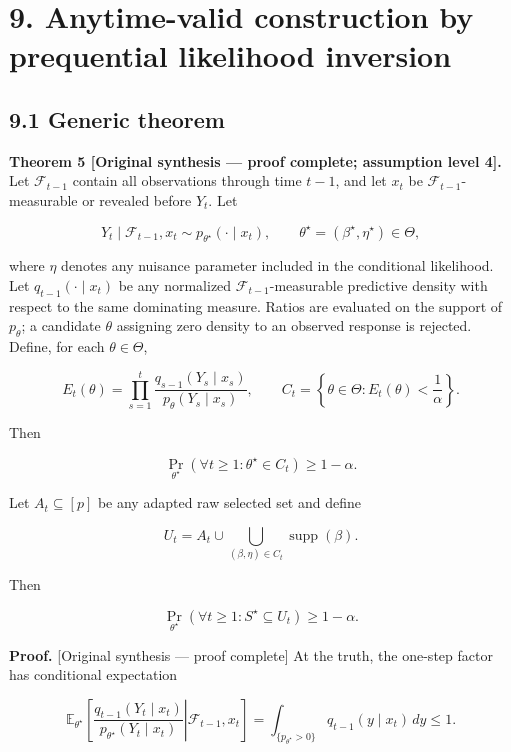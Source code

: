 \documentclass[
  english,
  11pt,
  a4paper,
]{article}
\begin{document}
\section{9. Anytime-valid construction by prequential likelihood
inversion}\label{anytime-valid-construction-by-prequential-likelihood-inversion}

\subsection{9.1 Generic theorem}\label{generic-theorem}

\textbf{Theorem 5 {[}Original synthesis --- proof complete; assumption
level 4{]}.} Let $\mathcal F_{t-1}$ contain all observations through
time $t-1$, and let $x_t$ be $\mathcal F_{t-1}$-measurable or
revealed before $Y_t$. Let

$$
Y_t\mid\mathcal F_{t-1},x_t
\sim p_{\theta^\star}(\cdot\mid x_t),
\qquad
\theta^\star=(\beta^\star,\eta^\star)\in\Theta,
$$

where $\eta$ denotes any nuisance parameter included in the
conditional likelihood. Let $q_{t-1}(\cdot\mid x_t)$ be any normalized
$\mathcal F_{t-1}$-measurable predictive density with respect to the
same dominating measure. Ratios are evaluated on the support of
$p_\theta$; a candidate $\theta$ assigning zero density to an
observed response is rejected. Define, for each $\theta\in\Theta$,

$$
E_t(\theta)
=
\prod_{s=1}^t
\frac{q_{s-1}(Y_s\mid x_s)}
     {p_\theta(Y_s\mid x_s)},
\qquad
C_t=\left\{\theta\in\Theta:E_t(\theta)<\frac1\alpha\right\}.
$$

Then

$$
\Pr_{\theta^\star}(\forall t\ge1:\theta^\star\in C_t)
\ge1-\alpha.
$$

Let $A_t\subseteq[p]$ be any adapted raw selected set and define

$$
U_t=A_t\cup
\bigcup_{(\beta,\eta)\in C_t}
\operatorname{supp}(\beta).
$$

Then

$$
\Pr_{\theta^\star}(\forall t\ge1:S^\star\subseteq U_t)
\ge1-\alpha.
$$

\textbf{Proof.} {[}Original synthesis --- proof complete{]} At the
truth, the one-step factor has conditional expectation

$$
\mathbb E_{\theta^\star}
\left[
\left.
\frac{q_{t-1}(Y_t\mid x_t)}
     {p_{\theta^\star}(Y_t\mid x_t)}
\right|\mathcal F_{t-1},x_t
\right]
=
\int_{\{p_{\theta^\star}>0\}}
q_{t-1}(y\mid x_t)\,dy
\le 1.
$$
\end{document}
